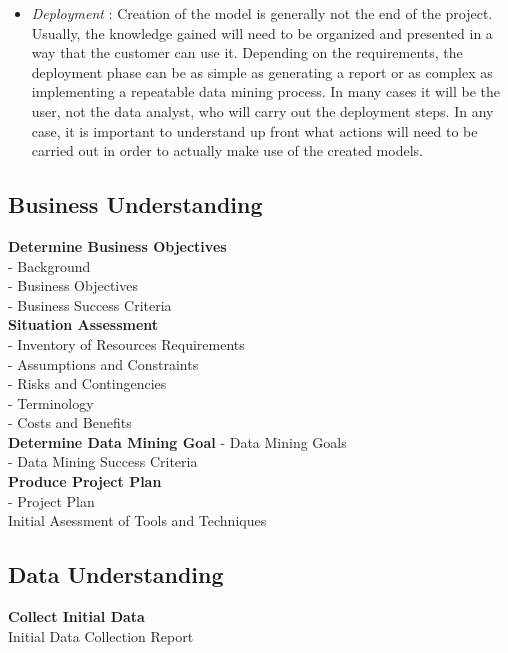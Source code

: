 \documentclass[12pt,a4paper,titlepage]{report}\usepackage{graphicx, color}
\begin{document}
\begin{itemize}
  \item \emph{Deployment} :
  Creation of the model is generally not the end of the project. Usually, the knowledge gained
will need to be organized and presented in a way that the customer can use it. Depending on
the requirements, the deployment phase can be as simple as generating a report or as complex
as implementing a repeatable data mining process. In many cases it will be the user, not the
data analyst, who will carry out the deployment steps. In any case, it is important to
understand up front what actions will need to be carried out in order to actually make use of
the created models.

\end{itemize}

\subsection{Business Understanding}
\textbf{Determine Business Objectives} \\
- Background \\
- Business Objectives \\
- Business Success Criteria \\

\textbf{Situation Assessment} \\
- Inventory of Resources Requirements \\
- Assumptions and Constraints \\
- Risks and Contingencies \\
- Terminology \\
- Costs and Benefits \\

\textbf{Determine Data Mining Goal} 
- Data Mining Goals \\
- Data Mining Success Criteria \\

\textbf{Produce Project Plan} \\ 
- Project Plan \\

Initial Asessment of Tools and Techniques 

\subsection{Data Understanding} 
\textbf{Collect Initial Data} \\
Initial Data Collection Report \\
\end{document}
